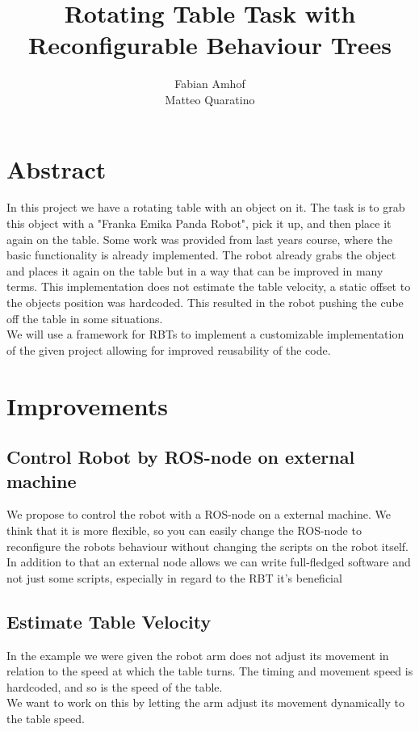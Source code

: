 \documentclass[report]{iisthesis}
\title{Rotating Table Task with Reconfigurable Behaviour Trees}
\author{Fabian Amhof \\ Matteo Quaratino}
\begin{document}
\maketitle
{}
\chapter{Abstract}
In this project we have a rotating table with an object on it. The task is to grab this object with a "Franka Emika Panda Robot", pick it up, and then place it again on the table. 
Some work was provided from last years course, where the basic functionality is already implemented. 
The robot already grabs the object and places it again on the table but in a way that can be improved in many terms.
This implementation does not estimate the table velocity, a static offset to the objects position was hardcoded. This resulted in the robot pushing the cube off the table in some situations.\\
We will use a framework for RBTs to implement a customizable implementation of the given project allowing for improved reusability of the code. 

\tableofcontents
\label{chap:declare}

\chapter{Improvements}
\label{improvements}

\section{Control Robot by ROS-node on external machine}
\label{separate_node}
We propose to control the robot with a ROS-node on a external machine. 
We think that it is more flexible, so you can easily change the ROS-node to reconfigure the robots behaviour without changing the scripts on the robot itself. In addition to that an external node allows we can write full-fledged software and not just
some scripts, especially in regard to the RBT it's beneficial

\section{Estimate Table Velocity}
\label{estimate_velocity}
In the example we were given the robot arm does not adjust its movement in relation to the speed at which the table 
turns. The timing and movement speed is hardcoded, and so is the speed of the table. \\
We want to work on this by letting the arm adjust its movement dynamically to the table speed.
\end{document}
